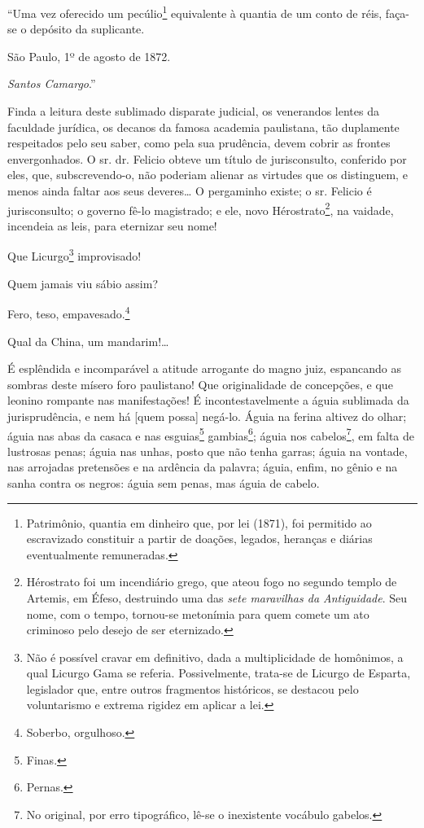 ``Uma vez oferecido um pecúlio\footnote{ Patrimônio, quantia em dinheiro
  que, por lei (1871), foi permitido ao escravizado constituir a partir
  de doações, legados, heranças e diárias eventualmente remuneradas.}
equivalente à quantia de um conto de réis, faça-se o depósito da
suplicante.

São Paulo, 1º de agosto de 1872.

\emph{Santos Camargo}.''

Finda a leitura deste sublimado disparate judicial, os venerandos lentes
da faculdade jurídica, os decanos da famosa academia paulistana, tão
duplamente respeitados pelo seu saber, como pela sua prudência, devem
cobrir as frontes envergonhados. O sr. dr. Felicio obteve um título de
jurisconsulto, conferido por eles, que, subscrevendo-o, não poderiam
alienar as virtudes que os distinguem, e menos ainda faltar aos seus
deveres\ldots{} O pergaminho existe; o sr. Felicio é jurisconsulto; o governo
fê-lo magistrado; e ele, novo Hérostrato\footnote{ Hérostrato foi um
  incendiário grego, que ateou fogo no segundo templo de Artemis, em
  Éfeso, destruindo uma das \emph{sete maravilhas da Antiguidade}. Seu
  nome, com o tempo, tornou-se metonímia para quem comete um ato
  criminoso pelo desejo de ser eternizado.}, na vaidade, incendeia as
leis, para eternizar seu nome!

Que Licurgo\footnote{ Não é possível cravar em definitivo, dada a
  multiplicidade de homônimos, a qual Licurgo Gama se referia.
  Possivelmente, trata-se de Licurgo de Esparta, legislador que, entre
  outros fragmentos históricos, se destacou pelo voluntarismo e extrema
  rigidez em aplicar a lei.} improvisado!

Quem jamais viu sábio assim?

Fero, teso, empavesado.\footnote{ Soberbo, orgulhoso.}

Qual da China, um mandarim!\ldots{}

É esplêndida e incomparável a atitude arrogante do magno juiz,
espancando as sombras deste mísero foro paulistano! Que originalidade de
concepções, e que leonino rompante nas manifestações! É
incontestavelmente a águia sublimada da jurisprudência, e nem há {[}quem
possa{]} negá-lo. Águia na ferina altivez do olhar; águia nas abas da
casaca e nas esguias\footnote{ Finas.} gambias\footnote{ Pernas.};
águia nos cabelos\footnote{ No original, por erro tipográfico, lê-se o
  inexistente vocábulo gabelos.}, em falta de lustrosas penas; águia nas
unhas, posto que não tenha garras; águia na vontade, nas arrojadas
pretensões e na ardência da palavra; águia, enfim, no gênio e na sanha
contra os negros: águia sem penas, mas águia de cabelo.

